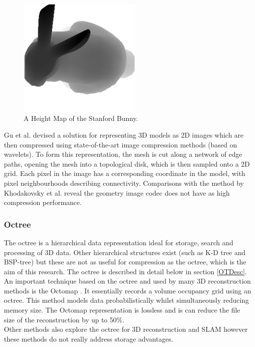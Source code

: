 \begin{figure}[!htb]
\centering
\includegraphics[width=6cm]{images/literature/HeightMap}
\caption{A Height Map of the Stanford Bunny.}
\label{fig:HeightMapExample}
\end{figure}

Gu et al. \cite{Gu02Geometry} devised a solution for representing 3D models as 2D images which are then compressed using state-of-the-art image compression methods (based on wavelets). To form this representation, the mesh is cut along a network of edge paths, opening the mesh into a topological disk, which is then sampled onto a 2D grid. Each pixel in the image has a corresponding coordinate in the model, with pixel neighbourhoods describing connectivity. Comparisons with the method by Khodakovsky et al. reveal the geometry image codec does not have as high compression performance. \\


\subsubsection{Octree}

The octree is a hierarchical data representation ideal for storage, search and processing of 3D data. Other hierarchical structures exist (such as K-D tree and BSP-tree) \cite{Samet06Foundations} but these are not as useful for compression as the octree, which is the aim of this research. The octree is described in detail below in section \ref{OTDesc}. An important technique based on the octree and used by many 3D reconstruction methods is the Octomap \cite{Wurm10Octomap}. It essentially records a volume occupancy grid using an octree. This method models data probabilistically whilst simultaneously reducing memory size. The Octomap representation is lossless and is can reduce the file size of the reconstruction by up to 50\%. \\

Other methods also explore the octree for 3D reconstruction and SLAM \cite{Fournier07Mapping,Meagher82Geometric,Fairfield07Real} however these methods do not really address storage advantages. 



